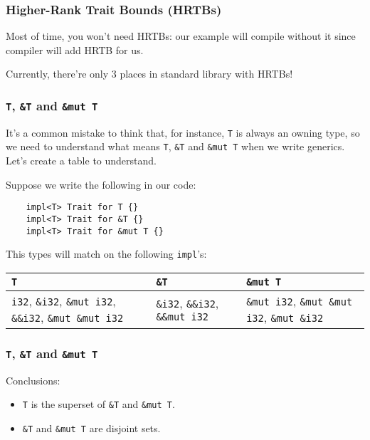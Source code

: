 \documentclass[aspectratio=1610,t]{beamer}
\begin{document}

\begin{frame}[fragile]
\frametitle{Higher-Rank Trait Bounds (HRTBs)}
Most of time, you won't need HRTBs: our example will compile without it since compiler will add HRTB for us.

Currently, there're only 3 places in standard library with HRTBs!
\end{frame}


\begin{frame}[fragile]
\frametitle{\texttt{T}, \texttt{\&T} and \texttt{\&mut T}}
It's a common mistake to think that, for instance, \texttt{T} is always an owning type, so we need to understand what means \texttt{T}, \texttt{\&T} and \texttt{\&mut T} when we write generics. Let's create a table to understand.

Suppose we write the following in our code:

\begin{verbatim}
    impl<T> Trait for T {}
    impl<T> Trait for &T {}
    impl<T> Trait for &mut T {}
\end{verbatim}

This types will match on the following \texttt{impl}'s:

\begin{table}[]
\begin{tabular}{|p{45mm}|p{25mm}|p{55mm}|}
\hline
\texttt{T} & \texttt{\&T} & \texttt{\&mut T} \\ \hline
\texttt{i32}, \texttt{\&i32}, \texttt{\&mut i32}, \texttt{\&\&i32}, \texttt{\&mut \&mut i32} & \texttt{\&i32}, \texttt{\&\&i32}, \texttt{\&\&mut i32} & \texttt{\&mut i32}, \texttt{\&mut \&mut i32}, \texttt{\&mut \&i32} \\ \hline
\end{tabular}
\end{table}
\end{frame}


\begin{frame}[fragile]
\frametitle{\texttt{T}, \texttt{\&T} and \texttt{\&mut T}}
Conclusions:

\begin{itemize}
    \item \texttt{T} is the superset of \texttt{\&T} and \texttt{\&mut T}.
    \item \texttt{\&T} and \texttt{\&mut T} are disjoint sets.
\end{itemize}
\end{frame}
\end{document}
